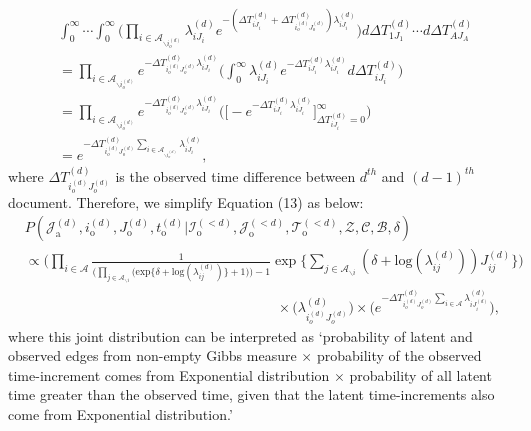 \documentclass[a4paper]{article}
\begin{document}
  	       \begin{equation}
  	       \begin{aligned}
  	       &\int_{0}^\infty\cdots\int_{0}^\infty \Big(\prod_{i\in \mathcal{A}_{\backslash i_o^{(d)}}} \lambda^{(d)}_{iJ_i}e^{-(\Delta T^{(d)}_{iJ_i} + \Delta T^{(d)}_{i_o^{(d)}J_o^{(d)}})\lambda^{(d)}_{iJ_i}} \Big)d\Delta T^{(d)}_{1J_1}\cdots d\Delta T^{(d)}_{AJ_A}\\&
  	       = \prod_{i\in \mathcal{A}_{\backslash i_o^{(d)}}} e^{- \Delta T^{(d)}_{i_o^{(d)}J_o^{(d)}}\lambda^{(d)}_{iJ_i}} \Big(\int_{0}^\infty \lambda^{(d)}_{iJ_i}e^{-\Delta T^{(d)}_{iJ_i} \lambda^{(d)}_{iJ_i}}  d\Delta T^{(d)}_{iJ_i}\Big)
  	       \\& =\prod_{i\in \mathcal{A}_{\backslash i_o^{(d)}}} e^{- \Delta T^{(d)}_{i_o^{(d)}J_o^{(d)}}\lambda^{(d)}_{iJ_i}} \Big(\Big [ - e^{-\Delta T^{(d)}_{iJ_i} \lambda^{(d)}_{iJ_i}}\Big]_{\Delta T^{(d)}_{iJ_i}  = 0} ^{\infty}\Big)
  	       \\& = e^{- \Delta T^{(d)}_{i_o^{(d)}J_o^{(d)}}\sum_{i\in \mathcal{A}_{\backslash i_o^{(d)}}}\lambda^{(d)}_{iJ_i}},
  	       \end{aligned}
  	       \end{equation}
  	       where $\Delta T^{(d)}_{i_o^{(d)}J_o^{(d)}}$ is the observed time difference between $d^{th}$ and $(d-1)^{th}$ document. Therefore, we simplify Equation (13) as below:
  	       \begin{equation}
  	       \begin{aligned}
  	       &P(\mathcal{J}^{(d)}_{\mbox{a}}, i^{(d)}_{\mbox{o}}, J^{(d)}_{\mbox{o}}, t^{(d)}_{\mbox{o}} |\mathcal{I}^{(<d)}_{\mbox{o}}, \mathcal{J}^{(<d)}_{\mbox{o}}, \mathcal{T}^{(<d)}_{\mbox{o}}, \mathcal{Z}, \mathcal{C}, \mathcal{B}, \delta)\\&\propto \Big(\prod_{i\in \mathcal{A}}\frac{1}{\Big(\prod_{j \in \mathcal{A}_{\backslash i}} \Big(\mbox{exp}\{\delta+\mbox{log}(\lambda_{ij}^{(d)})\} + 1\Big)\Big)-1}\exp\Big\{ \sum_{j \in \mathcal{A}_{\backslash i}} (\delta+\mbox{log}(\lambda_{ij}^{(d)}))J_{ij}^{(d)} \Big\}\Big)\\&\quad\quad\quad\quad\quad\quad\quad\quad\quad\quad\quad\quad\quad\quad\quad\quad\quad\quad\times \Big(\lambda^{(d)}_{i_o^{(d)}J_{o}^{(d)}}\Big)\times\Big( e^{-\Delta T^{(d)}_{i_o^{(d)}J_o^{(d)}}\sum\limits_{i\in \mathcal{A}}\lambda^{(d)}_{iJ^{(d)}_{i}}}\Big),
  	       \end{aligned}
  	       \end{equation}
  	       where this joint distribution can be interpreted as `probability of latent and observed edges from non-empty Gibbs measure $\times$ probability of the observed time-increment comes from Exponential distribution $\times$ probability of all latent time greater than the observed time, given that the latent time-increments also come from Exponential distribution.'
\end{document}
